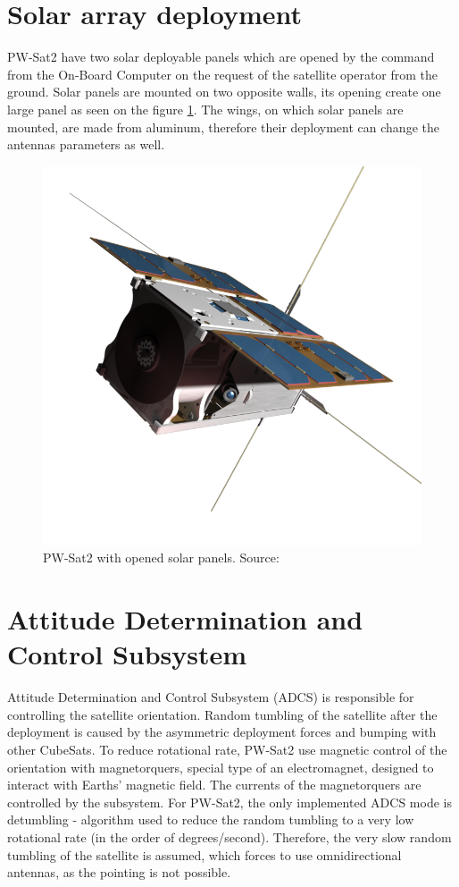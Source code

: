 \section{Solar array deployment}
PW-Sat2 have two solar deployable panels which are opened by the command from the On-Board Computer on the request of the satellite operator from the ground. Solar panels are mounted on two opposite walls, its opening create one large panel as seen on the figure \ref{PW-Sat_solar_panels}. The wings, on which solar panels are mounted, are made from aluminum, therefore their deployment can change the antennas parameters as well.
\begin{figure}[h]
    \centering
    \includegraphics[width=0.45\paperwidth]{img/3/pwsat_solar_panels.png}
    \caption{PW-Sat2 with opened solar panels. Source: \cite{PW_sat2_photo}}
    \label{PW-Sat_solar_panels}
\end{figure}

\section{Attitude Determination and Control Subsystem}
Attitude Determination and Control Subsystem (ADCS) is responsible for controlling the satellite orientation. Random tumbling of the satellite after the deployment is caused by the asymmetric deployment forces and bumping with other CubeSats. To reduce rotational rate, PW-Sat2 use magnetic control of the orientation with magnetorquers, special type of an electromagnet, designed to interact with Earths' magnetic field. The currents of the magnetorquers are controlled by the subsystem. For PW-Sat2, the only implemented ADCS mode is detumbling - algorithm used to reduce the random tumbling to a very low rotational rate (in the order of degrees/second). Therefore, the very slow random tumbling of the satellite is assumed, which forces to use omnidirectional antennas, as the pointing is not possible.

